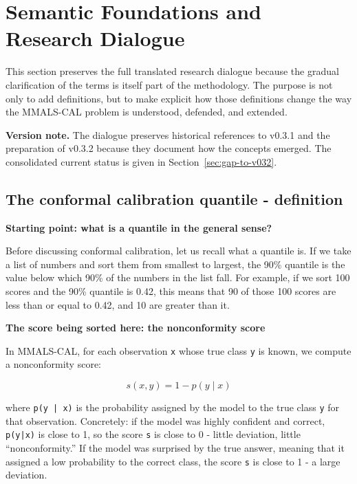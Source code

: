 \section{Semantic Foundations and Research Dialogue}\label{semantic-foundations-and-research-dialogue}

This section preserves the full translated research dialogue because the gradual clarification of the terms is itself part of the methodology. The purpose is not only to add definitions, but to make explicit how those definitions change the way the MMALS-CAL problem is understood, defended, and extended.

\noindent\textbf{Version note.} The dialogue preserves historical references to v0.3.1 and the preparation of v0.3.2 because they document how the concepts emerged. The consolidated current status is given in Section~\ref{sec:gap-to-v032}.

\subsection{The conformal calibration quantile - definition}\label{the-conformal-calibration-quantile---definition}

\textbf{Starting point: what is a quantile in the general sense?}

Before discussing conformal calibration, let us recall what a quantile is. If we take a list of numbers and sort them from smallest to largest, the 90\% quantile is the value below which 90\% of the numbers in the list fall. For example, if we sort 100 scores and the 90\% quantile is 0.42, this means that 90 of those 100 scores are less than or equal to 0.42, and 10 are greater than it.

\textbf{The score being sorted here: the nonconformity score}

In MMALS-CAL, for each observation \passthrough{\lstinline!x!} whose true class \passthrough{\lstinline!y!} is known, we compute a nonconformity score:

\[
s(x,y)=1-p(y\mid x)
\]

where \passthrough{\lstinline!p(y | x)!} is the probability assigned by the model to the true class \passthrough{\lstinline!y!} for that observation. Concretely: if the model was highly confident and correct, \passthrough{\lstinline!p(y|x)!} is close to 1, so the score \passthrough{\lstinline!s!} is close to 0 - little deviation, little ``nonconformity.'' If the model was surprised by the true answer, meaning that it assigned a low probability to the correct class, the score \passthrough{\lstinline!s!} is close to 1 - a large deviation.

